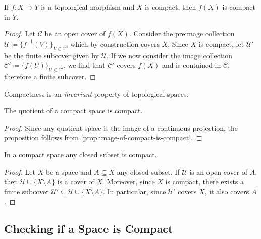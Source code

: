 \begin{proposition}
\label{prop:image-of-compact-is-compact}
If \(f: X \to Y\) is a topological morphism and \(X\) is compact, then \(f(X)\)
is compact in \(Y\).
\end{proposition}

\begin{proof}
Let \(\mathcal{C}\) be an open cover of \(f(X)\). Consider the preimage
collection \(\mathcal{U} \coloneq \{f^{-1}(V)\}_{V \in \mathcal{C}}\), which by
construction covers \(X\). Since \(X\) is compact, let \(\mathcal{U}'\) be the
finite subcover given by \(\mathcal{U}\). If we now consider the image
collection \(\mathcal{C}' \coloneq \{f(U)\}_{U \in \mathcal{C}'}\), we find that
\(\mathcal{C}'\) covers \(f(X)\) and is contained in \(\mathcal{C}\), therefore
a finite subcover.
\end{proof}

\begin{corollary}
\label{cor:compactness-topological-invariant}
Compactness is an \emph{invariant} property of topological spaces.
\end{corollary}

\begin{corollary}
\label{cor:quotient-of-compact-space-is-compact}
The quotient of a compact space is compact.
\end{corollary}

\begin{proof}
Since any quotient space is the image of a continuous projection, the
proposition follows from \cref{prop:image-of-compact-is-compact}.
\end{proof}

\begin{proposition}
\label{prop:closed-subset-compact}
In a compact space any closed subset is compact.
\end{proposition}

\begin{proof}
Let \(X\) be a space and \(A \subseteq X\) any closed subset. If \(\mathcal{U}\)
is an open cover of \(A\), then \(\mathcal{U} \cup \{X \setminus A\}\) is a
cover of \(X\). Moreover, since \(X\) is compact, there exists a finite subcover
\(\mathcal{U}' \subseteq \mathcal{U} \cup \{X \setminus A\}\). In particular,
since \(\mathcal{U}'\) covers \(X\), it also covers \(A\).
\end{proof}

\subsection{Checking if a Space is Compact}

